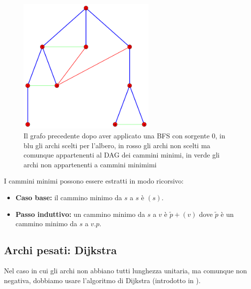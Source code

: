 \documentclass[a4paper,10pt]{amsbook}
\theoremstyle{plain}
\theoremstyle{definition}
\theoremstyle{remark}
\begin{document}
\begin{figure}[h]
  \centering
  \includegraphics[width=0.6\textwidth]{BFS}
  \caption{Il grafo precedente dopo aver applicato una BFS con
    sorgente $0$, in blu gli archi scelti per l'albero, in rosso gli
    archi non scelti ma comunque appartenenti al DAG dei cammini
    minimi, in verde gli archi non appartenenti a cammini minimimi}
  \label{fig:BFS}
\end{figure}

I cammini minimi possono essere estratti in modo ricorsivo:
\begin{itemize}
\item \textbf{Caso base:} il cammino minimo da $s$ a $s$ \`e $(s)$.
\item \textbf{Passo induttivo:} un cammino minimo da $s$ a $v$ \`e
  $\tilde p + (v)$ dove $\tilde p$ \`e un cammino minimo da $s$ a $v.p$.
\end{itemize}

\subsection{Archi pesati: Dijkstra}

Nel caso in cui gli archi non abbiano tutti lunghezza unitaria, ma
comunque non negativa, dobbiamo usare l'algoritmo di Dijkstra
(introdotto in \cite{dijkstra}).
\end{document}
